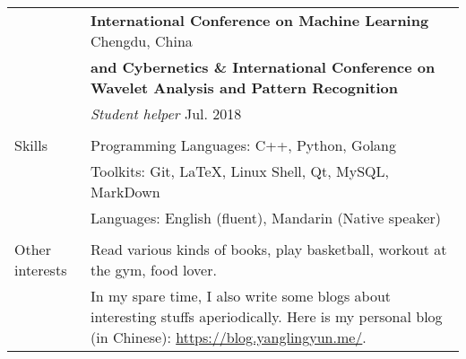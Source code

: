 \documentclass[letterpaper, 11pt]{article}
\begin{document}
\begin{longtable}{p{1.3in}p{4.8in}}
& \textbf{International Conference on Machine Learning} \hfill Chengdu, China \\
& \textbf{and Cybernetics \& International Conference on Wavelet Analysis and Pattern Recognition} \\
& \textit{Student helper} \hfill Jul. 2018 \\

& \\

{Skills}
& Programming Languages: C++, Python, Golang \\
& Toolkits: Git, \LaTeX, Linux Shell, Qt, MySQL, MarkDown \\
& Languages: English (fluent), Mandarin (Native speaker) \\
& \\


\nohyphens{Other interests}
& Read various kinds of books, play basketball, workout at the gym, food lover. \\
& In my spare time, I also write some blogs about interesting stuffs aperiodically. Here is my personal blog (in Chinese): \href{https://blog.yanglingyun.me/}{https://blog.yanglingyun.me/}. \\


\end{longtable}
\end{document}

